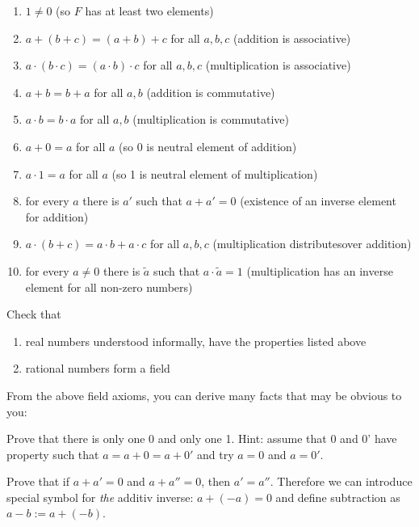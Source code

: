 \begin{enumerate}
  \item $1\neq 0$ (so $F$ has at least two elements)
  \item $a+(b+c)=(a+b)+c$ for all $a,b,c$ (addition is associative)
  \item $a\cdot (b\cdot c)=(a\cdot b)\cdot c$ for all $a,b,c$ (multiplication is associative)
  \item $a+b=b+a$ for all $a, b$ (addition is commutative)
  \item $a\cdot b=b\cdot a$ for all $a,b$ (multiplication is commutative)
  \item $a+0=a$ for all $a$ (so 0 is neutral element of addition)
  \item $a\cdot 1=a$ for all $a$ (so 1 is neutral element of multiplication)
  \item for every $a$ there is $a'$ such that $a+a'=0$ (existence of
    an inverse element for addition)
  \item $a\cdot (b+c) = a\cdot b + a\cdot c$ for all $a,b, c$
    (multiplication distributesover addition)
  \item for every $a\neq 0$ there is $\tilde a$ such that $a\cdot \tilde a=1$
    (multiplication has an inverse element for all non-zero numbers)
\end{enumerate}

\begin{prob}
  Check that
  \begin{enumerate}
    \item real numbers understood informally, have the properties
      listed above
    \item rational numbers form a field
  \end{enumerate}
\end{prob}

From the above field axioms, you can derive many facts that may be obvious
to you:

\begin{prob}
  Prove that there is only one 0 and only one 1. Hint: assume that
  0 and 0' have property such that $a=a+0=a+0'$ and try $a=0$ and $a=0'$.
\end{prob}

\begin{prob}
  Prove that if $a+a'=0$ and $a+a''=0$, then $a'=a''$.
  Therefore we can introduce special symbol for \textit{the} additiv
  inverse: $a + (-a)=0$ and define subtraction as $a-b := a + (-b)$.
\end{prob}

